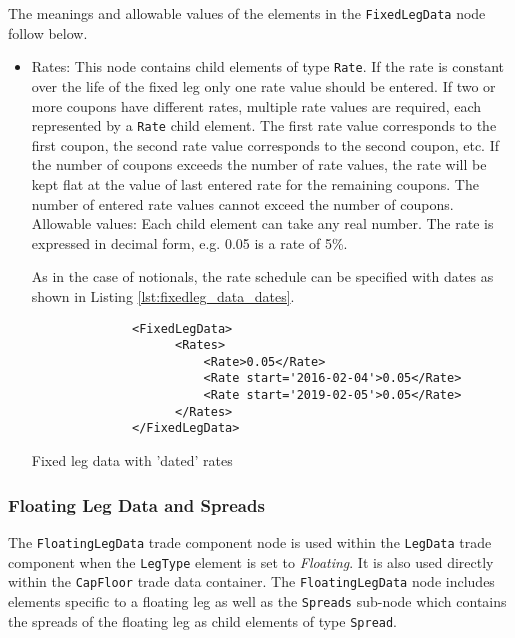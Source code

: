 The meanings and allowable values of the elements in the \lstinline!FixedLegData! node follow below.

\begin{itemize}

\item Rates: This node contains child elements of type
  \lstinline!Rate!. If the rate is constant over the life of the fixed
  leg only one rate value should be entered. If two or more coupons
  have different rates, multiple rate values are required, each
  represented by a \lstinline!Rate! child element. The first rate
  value corresponds to the first coupon, the second rate value
  corresponds to the second coupon, etc. If the number of coupons
  exceeds the number of rate values, the rate will be kept flat at the
  value of last entered rate for the remaining coupons.  The number of
  entered rate values cannot exceed the number of coupons. \\Allowable
  values: Each child element can take any  real number. The rate is
  expressed in decimal form, e.g. 0.05 is a rate of 5\%.

As in the case of notionals, the rate schedule can be specified with
dates as shown in Listing \ref{lst:fixedleg_data_dates}.
\begin{listing}[H]
\begin{verbatim}
              <FixedLegData>
                    <Rates>
                        <Rate>0.05</Rate>
                        <Rate start='2016-02-04'>0.05</Rate>
                        <Rate start='2019-02-05'>0.05</Rate>
                    </Rates>
              </FixedLegData>
\end{verbatim}
\caption{Fixed leg data with 'dated' rates}
\label{lst:fixedleg_data_dates}
\end{listing}

\end{itemize}

\subsubsection{Floating Leg Data and Spreads}
\label{ss:floatingleg_data}

The \lstinline!FloatingLegData! trade component node is used within the \lstinline!LegData! trade component when the \lstinline!LegType! element is set to \emph{Floating}. It is also used directly within the \lstinline!CapFloor! trade data container. 
The \lstinline!FloatingLegData! node includes elements specific to a floating leg as well as the \lstinline!Spreads! sub-node which contains the spreads of the floating leg as child elements of type \lstinline!Spread!.

